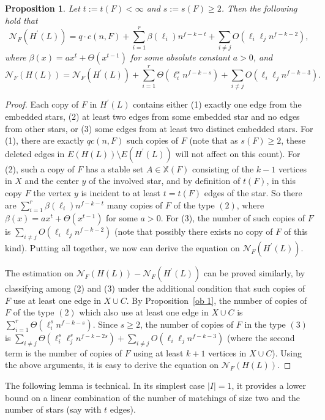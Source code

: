 \documentclass[10pt]{article}
\newtheorem{proposition}[theorem]{Proposition}
\begin{document}
\begin{proposition}\label{ob 3}
Let $t:=t(F)<\infty$ and $s:=s(F)\geq 2$. Then the following hold that
$$\mathcal{N}_F(H^\prime(L))=q\cdot c(n,F)+ \sum_{i=1}^{r} \beta(\ell_i)n^{f-k-t} +\sum_{i\neq j}O(\ell_i\ell_jn^{f-k-2}),$$
where $\beta(x)=ax^t+\Theta(x^{t-1})$ for some absolute constant $a>0$, and
$$\mathcal{N}_F(H(L))=\mathcal{N}_F(H^\prime(L))+ \sum_{i=1}^{r} \Theta (\ell_i^s n^{f-k-s})+\sum_{i\neq j}O(\ell_i\ell_jn^{f-k-3}).$$
\end{proposition}
\begin{proof}
Each copy of $F$ in $H^\prime(L)$ contains either (1) exactly one edge from the embedded stars, (2) at least two edges from some embedded star and no edges from other stars, or (3) some edges from at least two distinct embedded stars.
For (1), there are exactly $q c(n,F)$ such copies of $F$ (note that as $s(F)\geq 2$, these deleted edges in $E(H(L))\setminus E(H^\prime(L))$ will not affect on this count).
For (2), such a copy of $F$ has a stable set $A\in \mathbb{X}(F)$ consisting of the $k-1$ vertices in $X$ and the center $y$ of the involved star,
and by definition of $t(F)$, in this copy $F$ the vertex $y$ is incident to at least $t=t(F)$ edges of the star.
So there are $\sum_{i=1}^{r} \beta(\ell_i)n^{f-k-t}$ many copies of $F$ of the type $(2)$, where $\beta(x)=ax^t+\Theta(x^{t-1})$ for some $a>0$.
For (3), the number of such copies of $F$ is $\sum_{i\neq j}O(\ell_i\ell_jn^{f-k-2})$ (note that possibly there exists no copy of $F$ of this kind).
Putting all together, we now can derive the equation on $\mathcal{N}_F(H^\prime(L))$.

The estimation on $\mathcal{N}_F(H(L))-\mathcal{N}_F(H^\prime(L))$ can be proved similarly, by classifying among (2) and (3) under the additional condition that such copies of $F$ use at least one edge in $X\cup C$.
By Proposition~\ref{ob 1}, the number of copies of $F$ of the type $(2)$ which also use at least one edge in $X\cup C$ is $\sum_{i=1}^{r} \Theta (\ell_i^s n^{f-k-s})$.
Since $s\geq 2$, the number of copies of $F$ in the type $(3)$ is $\sum_{i\neq j} \Theta (\ell_i^s\ell_j^s n^{f-k-2s})+\sum_{i\neq j}O(\ell_i\ell_jn^{f-k-3})$ (where the second term is the number of copies of $F$ using at least $k+1$ vertices in $X\cup C$).
Using the above arguments, it is easy to derive the equation on $\mathcal{N}_F(H(L))$.
\end{proof}
The following lemma is technical.
In its simplest case $|I|=1$, it provides a lower bound on a linear combination of the number of matchings of size two and the number of stars (say with $t$ edges). 
\end{document}
